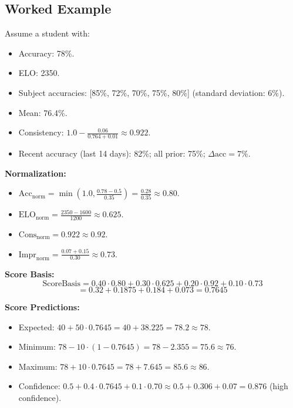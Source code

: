 \documentclass[sigconf,authordraft,twoside]{acmart}
\begin{document}
\subsection{Worked Example}

Assume a student with:
\begin{itemize}
\item Accuracy: 78\%.
\item ELO: 2350.
\item Subject accuracies: [85\%, 72\%, 70\%, 75\%, 80\%] (standard deviation: 6\%).
\item Mean: 76.4\%.
\item Consistency: $1.0 - \frac{0.06}{0.764 + 0.01} \approx 0.922$.
\item Recent accuracy (last 14 days): 82\%; all prior: 75\%; $\Delta \text{acc} = 7\%$.
\end{itemize}

\textbf{Normalization:}
\begin{itemize}
\item $\text{Acc}_{\text{norm}} = \min(1.0, \frac{0.78 - 0.5}{0.35}) = \frac{0.28}{0.35} \approx 0.80$.
\item $\text{ELO}_{\text{norm}} = \frac{2350 - 1600}{1200} \approx 0.625$.
\item $\text{Cons}_{\text{norm}} = 0.922 \approx 0.92$.
\item $\text{Impr}_{\text{norm}} = \frac{0.07 + 0.15}{0.30} \approx 0.73$.
\end{itemize}

\textbf{Score Basis:}
\begin{equation}
\text{ScoreBasis} = 0.40 \cdot 0.80 + 0.30 \cdot 0.625 + 0.20 \cdot 0.92 + 0.10 \cdot 0.73
\end{equation}
\begin{equation}
= 0.32 + 0.1875 + 0.184 + 0.073 = 0.7645
\end{equation}

\textbf{Score Predictions:}
\begin{itemize}
\item Expected: $40 + 50 \cdot 0.7645 = 40 + 38.225 = 78.2 \approx 78$.
\item Minimum: $78 - 10 \cdot (1 - 0.7645) = 78 - 2.355 = 75.6 \approx 76$.
\item Maximum: $78 + 10 \cdot 0.7645 = 78 + 7.645 = 85.6 \approx 86$.
\item Confidence: $0.5 + 0.4 \cdot 0.7645 + 0.1 \cdot 0.70 \approx 0.5 + 0.306 + 0.07 = 0.876$ (high confidence).
\end{itemize}
\end{document}
